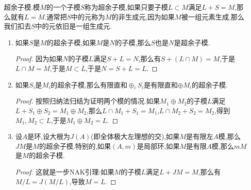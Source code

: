 超余子模.模$M$的一个子模$S$称为超余子模,如果只要子模$L\subset M$满足$L+S=M$,那么就有$L=M$.通常把$S$中的元称为$M$的非生成元,因为如果$M$被一组元素生成,那么我们扣去$S$中的元依旧是一组生成元.
\begin{enumerate}
	\item 如果$S$是$M$的超余子模,如果$M$是$N$的子模,那么$S$也是$N$是超余子模.
	\begin{proof}
		
		因为如果$N$的子模$L$满足$S+L=N$,那么有$S+(L\cap M)=M$,于是$L\cap M=M$,于是$M\subset L$,于是$N=S+L=L$.
	\end{proof}
    \item 如果$S_i$是$M_i$的超余子模,那么有限直和$\oplus_iS_i$是有限直和$\oplus M_i$的超余子模.
    \begin{proof}
    	
    	按照归纳法归结为证明两个模的情况.如果$M_1\oplus M_2$的子模$L$满足$L+S_1\oplus S_2=M_1\oplus M_2$,那么$L\cap M_1+S_1=M_1$,$L\cap M_2+S_2=M_2$,得到$M_1,M_2\subset L$,于是$M_1\oplus M_2=L$.
    \end{proof}
    \item 设$A$是环,设大根为$J(A)$(即全体极大左理想的交),如果$M$是有限左$A$模,那么$JM$是$M$的超余子模.特别的,如果$(A,m)$是局部环,如果$M$是有限$A$模,那么$mM$是$M$的超余子模.
    \begin{proof}
    	
    	这就是一步NAK引理:如果$M$的子模$L$满足$L+JM=M$,那么有$M/L=J(M/L)$,导致$M=L$.
    \end{proof}
\end{enumerate}

